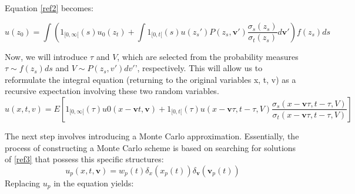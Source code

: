 \documentclass[a4paper,12pt]{article}
\begin{document}
	Equation \ref{ref2} becomes:
	
	\begin{equation*}
		u(z_0)= \int (1_{[0,\infty[}(s)u_0(z_t) + \int 1_{[0,t[} (s)u(z_s')P(z_s,\textbf{v}')\frac{\sigma_s (z_s)}{\sigma_t (z_s)}d\textbf{v}') f (z_s)ds 
	\end{equation*}
	
	Now, we will introduce $\tau$ and $V$, which are selected from the probability measures $\tau \sim f(z_s)ds$ and $V \sim P(z_s, v') dv'$', respectively. This will allow us to reformulate the integral equation (returning to the original variables x, t, v) as a recursive expectation involving these two random variables.
	\begin{equation}
		u(x,t,v) = E [1_{[0,\infty[}(\tau) u0(x - \textbf{v}t,\textbf{v}) + 1_{[0,t[}(\tau) u(x - \textbf{v}\tau,t - \tau,V)\frac{\sigma_s(x - \textbf{v}\tau,t - \tau,V)}{\sigma_t(x - \textbf{v}\tau,t - \tau,V)}] \label{ref3}
	\end{equation}
	
	The next step involves introducing a Monte Carlo approximation. Essentially, the process of constructing a Monte Carlo scheme is based on searching for solutions of \ref{ref3} that possess this specific structures: 
	\begin{equation*}
		u_p(x,t,\textbf{v}) = w_p(t) \delta_x(x_p(t))\delta_\textbf{v}(\textbf{v}_p(t))
	\end{equation*}
	Replacing \(u_p\) in the equation yields:
	
	
	
	
\end{document}

